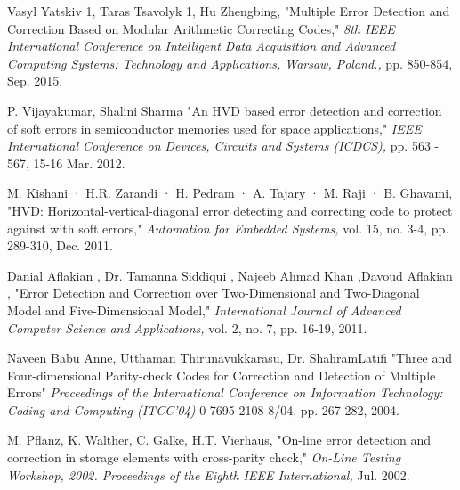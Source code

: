 \documentclass[12pt,a4paper]{report}
\begin{document}
\begin{thebibliography}{9}
Vasyl Yatskiv 1, Taras Tsavolyk 1, Hu Zhengbing, "Multiple Error Detection and Correction Based on Modular Arithmetic Correcting Codes," \textit{8th IEEE International Conference on Intelligent Data Acquisition and Advanced Computing Systems: Technology and Applications, Warsaw, Poland.,} pp. 850-854, Sep. 2015.

P. Vijayakumar, Shalini Sharma "An HVD based error detection and correction of soft errors in semiconductor memories used for space applications," \textit{IEEE International Conference on Devices, Circuits and Systems (ICDCS),} pp. 563 - 567, 15-16 Mar. 2012.

M. Kishani · H.R. Zarandi · H. Pedram · A. Tajary · M. Raji · B. Ghavami, "HVD: Horizontal-vertical-diagonal error detecting and correcting code to protect against with soft errors," \textit{Automation for Embedded Systems,} vol. 15, no. 3-4, pp. 289-310, Dec. 2011.

Danial Aflakian , Dr. Tamanna Siddiqui , Najeeb Ahmad Khan ,Davoud Aflakian , "Error Detection and Correction over Two-Dimensional and Two-Diagonal Model and Five-Dimensional Model," \textit{International Journal of Advanced Computer Science and Applications,} vol. 2, no. 7, pp. 16-19, 2011.

Naveen Babu Anne, Utthaman Thirunavukkarasu, Dr. ShahramLatifi "Three and Four-dimensional Parity-check Codes for Correction and Detection of Multiple Errors" \textit{Proceedings of the International Conference on Information Technology: Coding and Computing (ITCC’04)} 0-7695-2108-8/04, pp. 267-282, 2004.

M. Pflanz, K. Walther, C. Galke, H.T. Vierhaus, "On-line error detection and correction in storage elements with cross-parity check," \textit{On-Line Testing Workshop, 2002. Proceedings of the Eighth IEEE International,} Jul. 2002.

\end{thebibliography}
\end{document}
